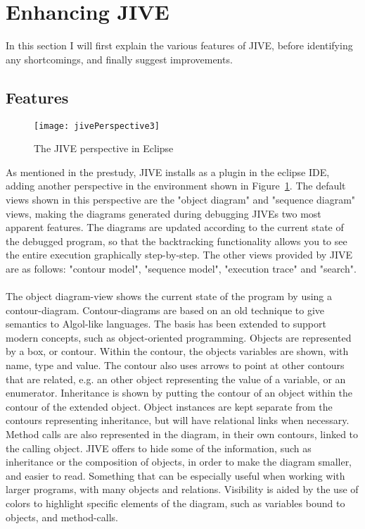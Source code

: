 \section{Enhancing JIVE}\label{enhJive}

In this section I will first explain the various features of JIVE, before identifying any shortcomings, and finally suggest improvements.

\subsection{Features}\label{jiveFeatures}

\begin{figure}[h]
	\texttt{[image: jivePerspective3]}
	\caption{The JIVE perspective in Eclipse}
	\label{fig:jivePerspective}
\end{figure}
As mentioned in the prestudy, JIVE installs as a plugin in the eclipse IDE, adding another perspective in the environment shown in Figure~\ref{fig:jivePerspective}.
The default views shown in this perspective are the "object diagram" and "sequence diagram" views, making the diagrams generated during debugging JIVEs two most apparent features.
The diagrams are updated according to the current state of the debugged program, so that the backtracking functionality allows you to see the entire execution graphically step-by-step.
The other views provided by JIVE are as follows: "contour model", "sequence model", "execution trace" and "search".
~\\

The object diagram-view shows the current state of the program by using a contour-diagram.%
Contour-diagrams are based on an old technique to give semantics to Algol-like languages.
The basis has been extended to support modern concepts, such as object-oriented programming.
Objects are represented by a box, or contour.
Within the contour, the objects variables are shown, with name, type and value.
The contour also uses arrows to point at other contours that are related, e.g. an other object representing the value of a variable, or an enumerator.
Inheritance is shown by putting the contour of an object within the contour of the extended object. 
Object instances are kept separate from the contours representing inheritance, but will have relational links when necessary.
Method calls are also represented in the diagram, in their own contours, linked to the calling object.
JIVE offers to hide some of the information, such as inheritance or the composition of objects, in order to make the diagram smaller, and easier to read.
Something that can be especially useful when working with larger programs, with many objects and relations.
Visibility is aided by the use of colors to highlight specific elements of the diagram, such as variables bound to objects, and method-calls.
~\\

